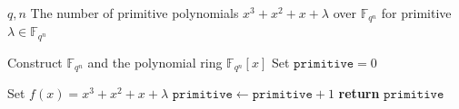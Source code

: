 \documentclass[preprint,12pt]{elsarticle}
\begin{document}
    \begin{algorithm}[h!]
    \caption{Testing Primitivity of $x^3+x^2+x+\lambda$}
    \label{Algo2}
    \begin{algorithmic}[1]
        \Require $q,n$
        \Ensure The number of primitive polynomials $x^3+x^2+x+\lambda$ over $\mathbb{F}_{q^n}$ for primitive $\lambda\in\mathbb{F}_{q^n}$

        \State Construct $\mathbb{F}_{q^n}$ and the polynomial ring $\mathbb{F}_{q^n}[x]$
        \State Set $\texttt{primitive}=0$

                \State Set $f(x)=x^3+x^2+x+\lambda$
                    \State $\texttt{primitive}\gets\texttt{primitive}+1$
                \EndIf
            \EndIf
        \EndFor
        \State \textbf{return} $\texttt{primitive}$
    \end{algorithmic}
    \end{algorithm}
\end{document}
